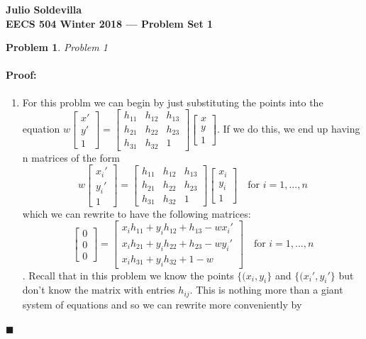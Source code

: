 \documentclass[12pt]{article}
\newenvironment{proof}{\paragraph{Proof: }}{\hfill$\blacksquare$}
\newtheorem{problem}{Problem}%
\begin{document}
\begin{center}
{\bf Julio Soldevilla}
\\
{\bf EECS 504 Winter 2018 --- Problem Set 1}
\end{center}

\begin{problem}
\normalfont
Problem 1
\end{problem}

\begin{proof}
\begin{enumerate}
\item  For this problm we can begin by just substituting the points into the equation $w\left[ \begin{matrix} x' \\ y' \\ 1\end{matrix} \right] = \left[ \begin{matrix} h_{11} & h_{12} & h_{13} \\ h_{21} & h_{22} & h_{23} \\ h_{31} & h_{32} & 1 \end{matrix} \right] \left[\begin{matrix} x \\ y \\1 \end{matrix}\right]$. If we do this, we end up having n matrices of the form \begin{equation} w\left[ \begin{matrix} x_i' \\ y_i' \\ 1\end{matrix} \right] = \left[ \begin{matrix} h_{11} & h_{12} & h_{13} \\ h_{21} & h_{22} & h_{23} \\ h_{31} & h_{32} & 1 \end{matrix} \right] \left[\begin{matrix} x_i \\ y_i \\1 \end{matrix}\right]\quad \text{for } i = 1,...,n\end{equation} which we can rewrite to have the following matrices: \begin{equation} \left[ \begin{matrix} 0 \\ 0 \\ 0 \end{matrix} \right] = \left[ \begin{matrix} x_i h_{11} + y_ih_{12} + h_{13} - wx_i' \\ x_i h_{21} + y_ih_{22} + h_{23} - wy_i' \\ x_i h_{31} + y_ih_{32} + 1 - w \end{matrix}\right]\quad \text{for } i = 1,...,n \end{equation}. Recall that in this problem we know the points $\{(x_i,y_i\}$ and $\{(x_i', y_i'\}$ but don't know the matrix with entries $h_{ij}$. This is nothing more than a giant system of equations and so we can rewrite more conveniently by 
\end{enumerate}
\end{proof}
\end{document}
